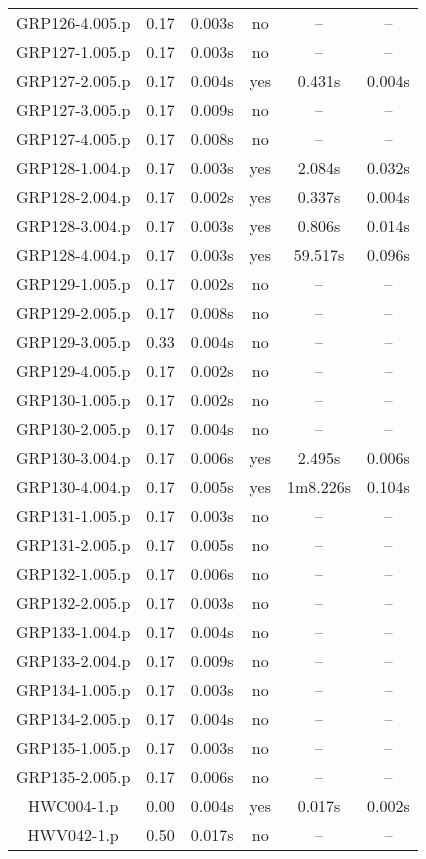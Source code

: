 \begin{center}
\begin{longtable}{||c | c | c | c | c | c||}
GRP126-4.005.p & 0.17 & 0.003s & no & -- & -- \\
GRP127-1.005.p & 0.17 & 0.003s & no & -- & -- \\
GRP127-2.005.p & 0.17 & 0.004s & yes & 0.431s & 0.004s \\
GRP127-3.005.p & 0.17 & 0.009s & no & -- & -- \\
GRP127-4.005.p & 0.17 & 0.008s & no & -- & -- \\
GRP128-1.004.p & 0.17 & 0.003s & yes & 2.084s & 0.032s \\
GRP128-2.004.p & 0.17 & 0.002s & yes & 0.337s & 0.004s \\
GRP128-3.004.p & 0.17 & 0.003s & yes & 0.806s & 0.014s \\
GRP128-4.004.p & 0.17 & 0.003s & yes & 59.517s & 0.096s \\
GRP129-1.005.p & 0.17 & 0.002s & no & -- & -- \\
GRP129-2.005.p & 0.17 & 0.008s & no & -- & -- \\
GRP129-3.005.p & 0.33 & 0.004s & no & -- & -- \\
GRP129-4.005.p & 0.17 & 0.002s & no & -- & -- \\
GRP130-1.005.p & 0.17 & 0.002s & no & -- & -- \\
GRP130-2.005.p & 0.17 & 0.004s & no & -- & -- \\
GRP130-3.004.p & 0.17 & 0.006s & yes & 2.495s & 0.006s \\
GRP130-4.004.p & 0.17 & 0.005s & yes & 1m8.226s & 0.104s \\
GRP131-1.005.p & 0.17 & 0.003s & no & -- & -- \\
GRP131-2.005.p & 0.17 & 0.005s & no & -- & -- \\
GRP132-1.005.p & 0.17 & 0.006s & no & -- & -- \\
GRP132-2.005.p & 0.17 & 0.003s & no & -- & -- \\
GRP133-1.004.p & 0.17 & 0.004s & no & -- & -- \\
GRP133-2.004.p & 0.17 & 0.009s & no & -- & -- \\
GRP134-1.005.p & 0.17 & 0.003s & no & -- & -- \\
GRP134-2.005.p & 0.17 & 0.004s & no & -- & -- \\
GRP135-1.005.p & 0.17 & 0.003s & no & -- & -- \\
GRP135-2.005.p & 0.17 & 0.006s & no & -- & -- \\
HWC004-1.p & 0.00 & 0.004s & yes & 0.017s & 0.002s \\
HWV042-1.p & 0.50 & 0.017s & no & -- & -- \\

\end{longtable}
\end{center}
